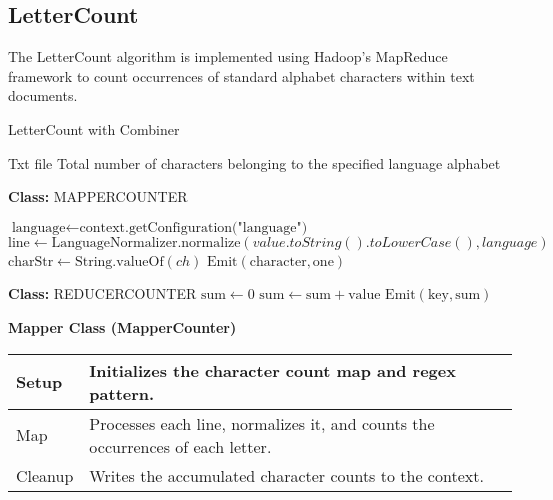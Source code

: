     

\subsection{LetterCount}
The LetterCount algorithm is implemented using Hadoop's MapReduce framework to count occurrences of standard alphabet characters within text documents.

\begin{algorithm}
    \caption{LetterCount with Combiner}
    \begin{algorithmic}[1]
    \Require Txt file
    \Ensure Total number of characters belonging to the specified language alphabet
    \\
    \Statex
    
    \textbf{Class:} MAPPERCOUNTER

        \State $\text{language} \gets \text{context.getConfiguration("language")}$ 
    \EndProcedure\\
    
        \State $\text{line} \gets \text{LanguageNormalizer.normalize}(value.toString().toLowerCase(), language)$
                \State $\text{charStr} \gets \text{String.valueOf}(ch)$
                \State $\text{Emit}(\text{character}, \text{one})$
        \EndFor
    \EndProcedure\\
        
    \Statex
    
    \textbf{Class:} REDUCERCOUNTER
        \State $\text{sum} \gets 0$
            \State $\text{sum} \gets \text{sum} + \text{value}$
        \EndFor
        \State $\text{Emit}(\text{key}, \text{sum})$
    \EndProcedure
    \end{algorithmic}
    \end{algorithm}

\textbf{Mapper Class (MapperCounter)}
\begin{longtable}{|>{\raggedright\arraybackslash}p{}|>{\raggedright\arraybackslash}p{}|}
    \hline
    Setup &  Initializes the character count map and regex pattern.\\
    \hline
    Map &  Processes each line, normalizes it, and counts the occurrences of each letter.\\
    \hline
    Cleanup &Writes the accumulated character counts to the context.\\
    \hline
\end{longtable}



